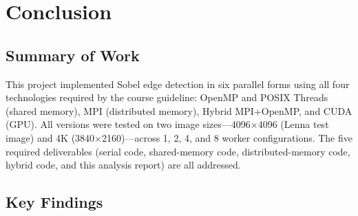 \documentclass[12pt,a4paper]{article}
\begin{document}
\section{Conclusion}
\label{sec:conclusion}

\subsection{Summary of Work}

This project implemented Sobel edge detection in six parallel forms using all
four technologies required by the course guideline: OpenMP and POSIX Threads
(shared memory), MPI (distributed memory), Hybrid MPI+OpenMP, and CUDA (GPU).
All versions were tested on two image sizes---4096$\times$4096 (Lenna test image)
and 4K (3840$\times$2160)---across 1, 2, 4, and 8 worker configurations. The five
required deliverables (serial code, shared-memory code, distributed-memory
code, hybrid code, and this analysis report) are all addressed.

\subsection{Key Findings}
\end{document}
